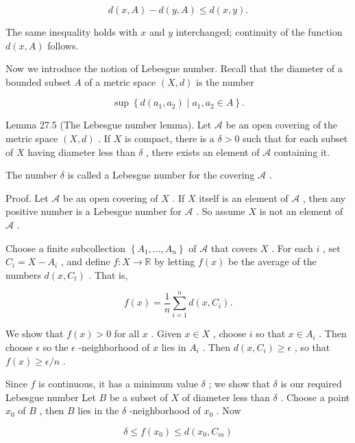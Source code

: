 \documentclass[10pt]{article}
\begin{document}
\[
d\left( {x,A}\right)  - d\left( {y,A}\right)  \leq  d\left( {x,y}\right) .
\]

The same inequality holds with \(x\) and \(y\) interchanged; continuity of the function \(d\left( {x,A}\right)\) follows.

Now we introduce the notion of Lebesgue number. Recall that the diameter of a bounded subset \(A\) of a metric space \(\left( {X,d}\right)\) is the number

\[
\sup \left\{  {d\left( {{a}_{1},{a}_{2}}\right)  \mid  {a}_{1},{a}_{2} \in  A}\right\}  .
\]

Lemma 27.5 (The Lebesgue number lemma). Let \(\mathcal{A}\) be an open covering of the metric space \(\left( {X,d}\right)\) . If \(X\) is compact, there is a \(\delta  > 0\) such that for each subset of \(X\) having diameter less than \(\delta\) , there exists an element of \(\mathcal{A}\) containing it.

The number \(\delta\) is called a Lebesgue number for the covering \(\mathcal{A}\) .

Proof. Let \(\mathcal{A}\) be an open covering of \(X\) . If \(X\) itself is an element of \(\mathcal{A}\) , then any positive number is a Lebesgue number for \(\mathcal{A}\) . So assume \(X\) is not an element of \(\mathcal{A}\) .

Choose a finite subcollection \(\left\{  {{A}_{1},\ldots ,{A}_{n}}\right\}\) of \(\mathcal{A}\) that covers \(X\) . For each \(i\) , set \({C}_{i} = X - {A}_{i}\) , and define \(f : X \rightarrow  \mathbb{R}\) by letting \(f\left( x\right)\) be the average of the numbers \(d\left( {x,{C}_{t}}\right)\) . That is,

\[
f\left( x\right)  = \frac{1}{n}\mathop{\sum }\limits_{{i = 1}}^{n}d\left( {x,{C}_{i}}\right) .
\]

We show that \(f\left( x\right)  > 0\) for all \(x\) . Given \(x \in  X\) , choose \(i\) so that \(x \in  {A}_{i}\) . Then choose \(\epsilon\) so the \(\epsilon\) -neighborhood of \(x\) lies in \({A}_{i}\) . Then \(d\left( {x,{C}_{i}}\right)  \geq  \epsilon\) , so that \(f\left( x\right)  \geq  \epsilon /n\) .

Since \(f\) is continuous, it has a minimum value \(\delta\) ; we show that \(\delta\) is our required Lebesgue number Let \(B\) be a subset of \(X\) of diameter less than \(\delta\) . Choose a point \({x}_{0}\) of \(B\) , then \(B\) lies in the \(\delta\) -neighborhood of \({x}_{0}\) . Now

\[
\delta  \leq  f\left( {x}_{0}\right)  \leq  d\left( {{x}_{0},{C}_{m}}\right)
\]
\end{document}
